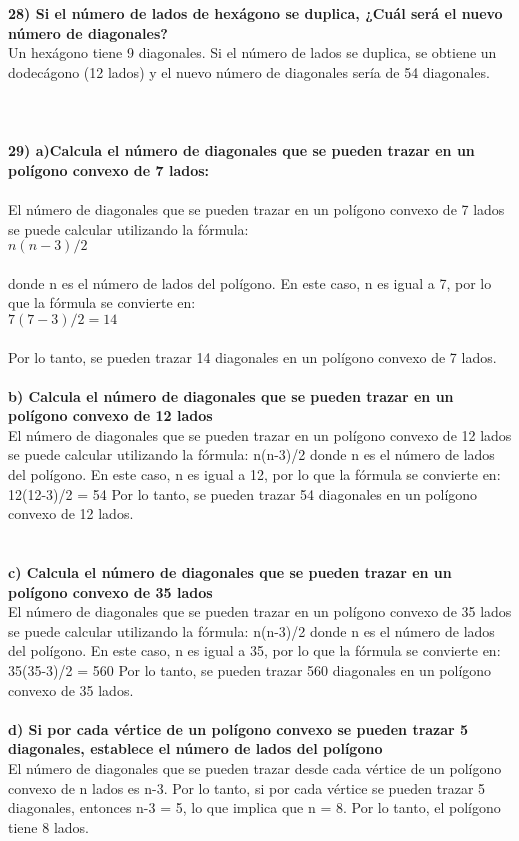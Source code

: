 \documentclass{article}
\begin{document}
{\bf 28) Si el número de lados de hexágono se duplica, ¿Cuál será el nuevo número de diagonales? }\\
Un hexágono tiene 9 diagonales. Si el número de lados se duplica, se obtiene un dodecágono (12 lados) y el nuevo número de diagonales sería de 54 diagonales.\\\\
\\
\\
{\bf 29) a)Calcula el número de diagonales que se pueden trazar en un polígono convexo de 7 lados: }\\
\\
El número de diagonales que se pueden trazar en un polígono convexo de 7 lados se puede calcular utilizando la fórmula:\\
$n(n-3)/2$\\
\\
donde n es el número de lados del polígono. En este caso, n es igual a 7, por lo que la fórmula se convierte en:\\
$7(7-3)/2 = 14$\\
\\
Por lo tanto, se pueden trazar 14 diagonales en un polígono convexo de 7 lados.\\
\\
{\bf b) Calcula el número de diagonales que se pueden trazar en un polígono convexo de 12 lados }\\
El número de diagonales que se pueden trazar en un polígono convexo de 12 lados se puede calcular utilizando la fórmula:  n(n-3)/2  donde n es el número de lados del polígono. En este caso, n es igual a 12, por lo que la fórmula se convierte en:  12(12-3)/2 = 54  Por lo tanto, se pueden trazar 54 diagonales en un polígono convexo de 12 lados.\\
\\
\\
{\bf c) Calcula el número de diagonales que se pueden trazar en un polígono convexo de 35 lados }\\
El número de diagonales que se pueden trazar en un polígono convexo de 35 lados se puede calcular utilizando la fórmula:  n(n-3)/2  donde n es el número de lados del polígono. En este caso, n es igual a 35, por lo que la fórmula se convierte en:  35(35-3)/2 = 560  Por lo tanto, se pueden trazar 560 diagonales en un polígono convexo de 35 lados.\\
\\
{\bf d) Si por cada vértice de un polígono convexo se pueden trazar 5 diagonales, establece el número de lados del polígono}\\
El número de diagonales que se pueden trazar desde cada vértice de un polígono convexo de n lados es n-3. Por lo tanto, si por cada vértice se pueden trazar 5 diagonales, entonces n-3 = 5, lo que implica que n = 8. Por lo tanto, el polígono tiene 8 lados.\\
\end{document}

